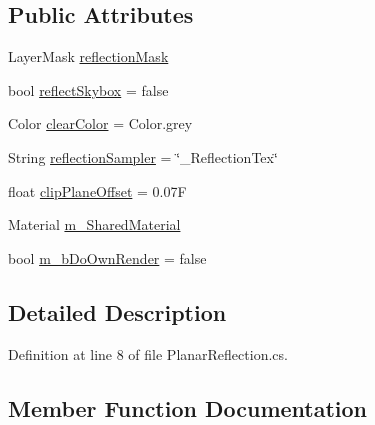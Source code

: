 \subsection*{Public Attributes}
\begin{DoxyCompactItemize}
\item 
Layer\+Mask \mbox{\hyperlink{class_unity_standard_assets_1_1_water_1_1_planar_reflection_a9dc798eef2279794ab2d34242810a628}{reflection\+Mask}}
\item 
bool \mbox{\hyperlink{class_unity_standard_assets_1_1_water_1_1_planar_reflection_ac9d2d7b456df4e66601c899f34520dce}{reflect\+Skybox}} = false
\item 
Color \mbox{\hyperlink{class_unity_standard_assets_1_1_water_1_1_planar_reflection_ae538e3cf0771e8fe2b0b750e1b709f29}{clear\+Color}} = Color.\+grey
\item 
String \mbox{\hyperlink{class_unity_standard_assets_1_1_water_1_1_planar_reflection_a1677dea47658aae145100204e24cf51f}{reflection\+Sampler}} = \char`\"{}\+\_\+\+Reflection\+Tex\char`\"{}
\item 
float \mbox{\hyperlink{class_unity_standard_assets_1_1_water_1_1_planar_reflection_a37ace0a55e4c59c794795f8d610c4afe}{clip\+Plane\+Offset}} = 0.\+07F
\item 
Material \mbox{\hyperlink{class_unity_standard_assets_1_1_water_1_1_planar_reflection_ad832b3b5da159247155b6eceaa2829f5}{m\+\_\+\+Shared\+Material}}
\item 
bool \mbox{\hyperlink{class_unity_standard_assets_1_1_water_1_1_planar_reflection_afe359ecf70b56bf919ab796fcb000583}{m\+\_\+b\+Do\+Own\+Render}} = false
\end{DoxyCompactItemize}


\subsection{Detailed Description}


Definition at line 8 of file Planar\+Reflection.\+cs.



\subsection{Member Function Documentation}
\mbox{\label{class_unity_standard_assets_1_1_water_1_1_planar_reflection_a38cee17bffa51b0c7c6ab009b7db80d2}} 
